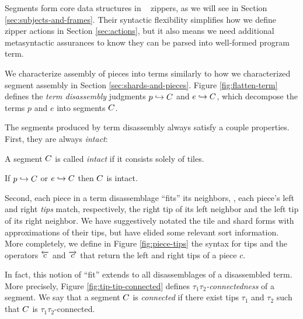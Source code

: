 Segments form core data structures in \ty~ zippers,
as we will see in Section \ref{sec:subjects-and-frames}.
Their syntactic flexibility simplifies how we define
zipper actions in Section
\ref{sec:actions}, but it also means we need additional
metasyntactic assurances to know they can be parsed into
well-formed program term.

We characterize assembly of pieces into terms
similarly to how we characterized segment assembly
in Section \ref{sec:shards-and-pieces}.
Figure \ref{fig:flatten-term} defines the \emph{term
disassembly} judgments $p\hookrightarrow C$
and $e\hookrightarrow C$, which decompose
the terms $p$ and $e$ into segments $C$.



The segments produced by term disassembly always satisfy
a couple properties. First, they are always \emph{intact}:
\begin{definition}
  A segment $C$ is called \emph{intact} if it consists
  solely of tiles.
\end{definition}
\begin{lemma}
  If $p\hookrightarrow C$ or $e\hookrightarrow C$ then $C$ is intact.
\end{lemma}

Second, each piece in a term disassemblage ``fits''
its neighbors, \ie, each piece's left and right \emph{tips}
match, respectively, the right tip of its left neighbor
and the left tip of its right neighbor.
We have suggestively notated the tile and shard forms with
approximations of their tips, but have elided some relevant
sort information.
More completely, we define in Figure \ref{fig:piece-tips}
the syntax for tips and the operators $\overleftarrow{c}$
and $\overrightarrow{c}$ that return the left and right tips
of a piece $c$.

In fact, this notion of ``fit'' extends to all disassemblages
of a disassembled term. 
More precisely, Figure \ref{fig:tip-tip-connected} defines
\emph{$\tau_1\tau_2$-connectedness} of a segment.
We say that a segment $C$ is \emph{connected} if there exist
tips $\tau_1$ and $\tau_2$ such that $C$ is $\tau_1\tau_2$-connected.

